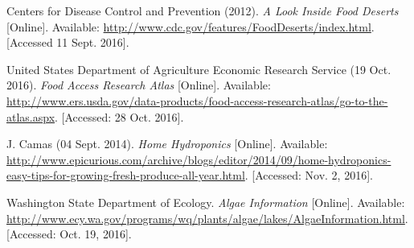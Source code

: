 \documentclass[12pt]{article}
\begin{document}
\pagebreak

\begin{thebibliography}{9}
    Centers for Disease Control and Prevention (2012).
    \textit{A Look Inside Food Deserts} [Online].
    Available: \url{http://www.cdc.gov/features/FoodDeserts/index.html}.
    [Accessed 11 Sept. 2016].

    United States Department of Agriculture Economic Research Service (19 Oct. 2016).
    \textit{Food Access Research Atlas} [Online].
    Available:
    \url{http://www.ers.usda.gov/data-products/food-access-research-atlas/go-to-the-atlas.aspx}.
    [Accessed: 28 Oct. 2016].

    J. Camas (04 Sept. 2014).
    \textit{Home Hydroponics} [Online].
    Available:
    \url{http://www.epicurious.com/archive/blogs/editor/2014/09/home-hydroponics-easy-tips-for-growing-fresh-produce-all-year.html}.
    [Accessed: Nov. 2, 2016].

    Washington State Department of Ecology.
    \textit{Algae Information} [Online].
    Available: \url{http://www.ecy.wa.gov/programs/wq/plants/algae/lakes/AlgaeInformation.html}.
    [Accessed: Oct. 19, 2016].

\end{thebibliography}
\end{document}
